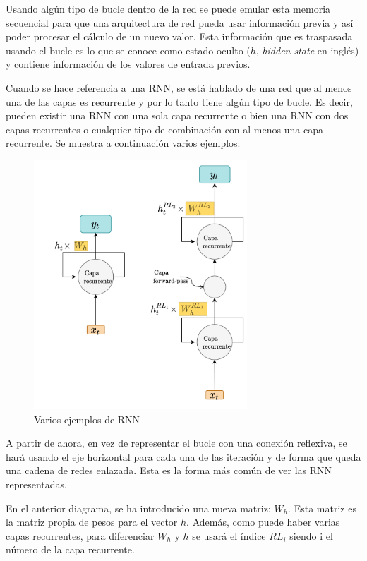 Usando algún tipo de bucle dentro de la red se puede emular esta memoria secuencial para que una arquitectura de red pueda usar información previa y así poder procesar el cálculo de un nuevo valor. Esta información que es traspasada usando el bucle es lo que se conoce como estado oculto ($h$, \textit{hidden state} en inglés) y contiene información de los valores de entrada previos.
\newline

Cuando se hace referencia a una RNN, se está hablado de una red que al menos una de las capas es recurrente y por lo tanto tiene algún tipo de bucle. Es decir, pueden existir una RNN con una sola capa recurrente o bien una RNN con dos capas recurrentes o cualquier tipo de combinación con al menos una capa recurrente. Se muestra a continuación varios ejemplos:
\begin{figure}[H]
    \centering
    \includegraphics[width=8cm]{images/state-of-art/rnn/rnn-compact.png}
    \caption{Varios ejemplos de RNN}
    \label{fig:rnn-compact}
\end{figure}

A partir de ahora, en vez de representar el bucle con una conexión reflexiva, se hará usando el eje horizontal para cada una de las iteración y de forma que queda una cadena de redes enlazada. Esta es la forma más común de ver las RNN representadas.
\newline

En el anterior diagrama, se ha introducido una nueva matriz: $W_h$. Esta matriz es la matriz propia de pesos para el vector $h$. Además, como puede haber varias capas recurrentes, para diferenciar $W_h$ y $h$ se usará el índice $RL_i$ siendo i el número de la capa recurrente.